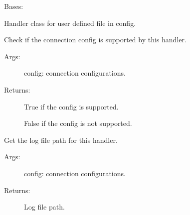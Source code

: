 \documentclass[letterpaper,10pt,english]{sphinxmanual}
\begin{document}

\begin{fulllineitems}
\label{\detokenize{QConnectionLibrary:QConnectionLibrary.qlogger.QFileHandler}}
\sphinxAtStartPar
Bases: 

\sphinxAtStartPar
Handler class for user defined file in config.

\begin{fulllineitems}
\label{\detokenize{QConnectionLibrary:QConnectionLibrary.qlogger.QFileHandler.get_config_supported}}
\sphinxAtStartPar
Check if the connection config is supported by this handler.
\begin{description}
\item[{Args:}] \leavevmode
\sphinxAtStartPar
config: connection configurations.

\item[{Returns:}] \leavevmode
\sphinxAtStartPar
True if the config is supported.

\sphinxAtStartPar
False if the config is not supported.

\end{description}

\end{fulllineitems}


\begin{fulllineitems}
\label{\detokenize{QConnectionLibrary:QConnectionLibrary.qlogger.QFileHandler.get_log_path}}
\sphinxAtStartPar
Get the log file path for this handler.
\begin{description}
\item[{Args:}] \leavevmode
\sphinxAtStartPar
config: connection configurations.

\item[{Returns:}] \leavevmode
\sphinxAtStartPar
Log file path.

\end{description}

\end{fulllineitems}


\end{fulllineitems}
\end{document}

